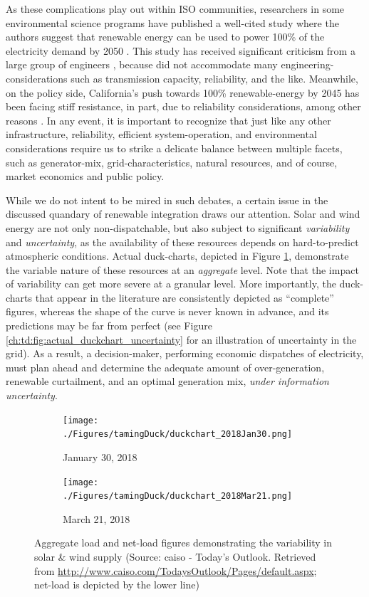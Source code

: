 As these complications play out within ISO communities, researchers in some environmental science programs have published a well-cited study where the authors suggest that renewable energy can be used to power 100\% of the electricity demand by 2050 \citep{Jacobson2015}. This study has received significant criticism from a large group of engineers \citep{Clack2017, BistlineE3988}, because \cite{Jacobson2015} did not accommodate many engineering-considerations such as transmission capacity, reliability, and the like. Meanwhile, on the policy side, California's push towards 100\% renewable-energy by 2045 \citep{CalBill2018} has been facing stiff resistance, in part, due to reliability considerations, among other reasons \citep{Nikolewski2017}. In any event, it is important to recognize that just like any other infrastructure, reliability, efficient system-operation, and environmental considerations require us to strike a delicate balance between multiple facets, such as generator-mix, grid-characteristics, natural resources, and of course, market economics and public policy.

While we do not intent to be mired in such debates, a certain issue in the discussed quandary of renewable integration draws our attention. Solar and wind energy are not only non-dispatchable, but also subject to significant \emph{variability} and \emph{uncertainty}, as the availability of these resources depends on hard-to-predict atmospheric conditions. Actual duck-charts, depicted in Figure \ref{ch:td:fig:actual_duckchart_variability}, demonstrate the variable nature of these resources at an \emph{aggregate} level. Note that the impact of variability can get more severe at a granular level. More importantly, the duck-charts that appear in the literature are consistently depicted as ``complete'' figures, whereas the shape of the curve is never known in advance, and its predictions may be far from perfect (see Figure \ref{ch:td:fig:actual_duckchart_uncertainty} for an illustration of uncertainty in the grid). As a result, a decision-maker, performing economic dispatches of electricity, must plan ahead and determine the adequate amount of over-generation, renewable curtailment, and an optimal generation mix, \textit{under information uncertainty}.

\begin{figure}[h]
\begin{subfigure}[t]{0.5\textwidth}
\texttt{[image: ./Figures/tamingDuck/duckchart\_2018Jan30.png]}
\caption{January 30, 2018}
\end{subfigure}
\begin{subfigure}[t]{0.5\textwidth}
\texttt{[image: ./Figures/tamingDuck/duckchart\_2018Mar21.png]}
\caption{March 21, 2018}
\end{subfigure}
\caption{Aggregate load and net-load figures demonstrating the variability in solar \& wind supply (Source: \gls{caiso} - Today's Outlook. Retrieved from \url{http://www.caiso.com/TodaysOutlook/Pages/default.aspx}; net-load is depicted by the lower line)}
\label{ch:td:fig:actual_duckchart_variability}
\end{figure}

